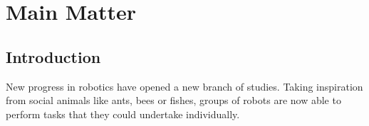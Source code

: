 \documentclass[oneside, a4paper, 12pt]{memoir}
\begin{document}
\tableofcontents
\listoffigures
\listoftables


\part*{Main Matter}
\mainmatter
\chapter{Introduction}

	

	
	New progress in robotics have opened a new branch of studies. Taking inspiration from social animals like ants, bees or fishes, groups of robots are now able to perform tasks that they could undertake individually.
		
\end{document}
